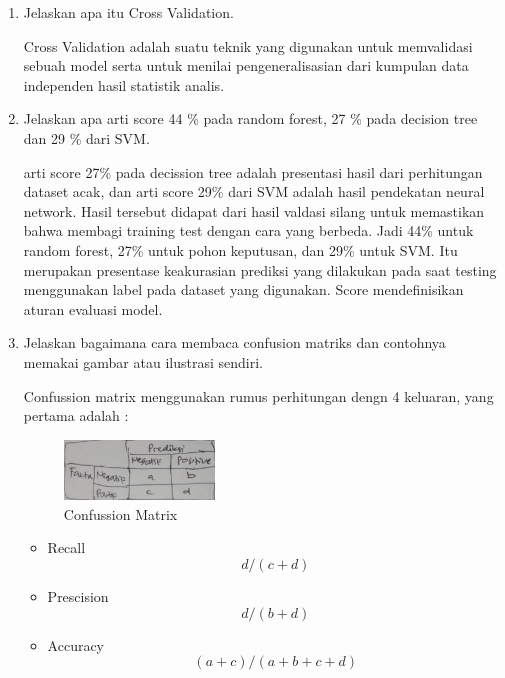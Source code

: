 \begin{enumerate}
        \item Jelaskan apa itu Cross Validation. \par
        Cross Validation adalah suatu teknik yang digunakan untuk memvalidasi sebuah model serta untuk menilai pengeneralisasian dari kumpulan data independen hasil statistik analis. 
        \item Jelaskan apa arti score 44 \% pada random forest, 27 \% pada decision tree dan 29 \% dari SVM. \par
        arti score 27\% pada decission tree adalah presentasi hasil dari perhitungan dataset acak, dan arti score 29\% dari SVM adalah hasil pendekatan neural network.  Hasil tersebut didapat dari hasil valdasi silang untuk memastikan bahwa membagi training test dengan cara yang berbeda. Jadi 44\% untuk random forest, 27\% untuk pohon keputusan, dan 29\% untuk SVM. Itu merupakan presentase keakurasian prediksi yang dilakukan pada saat testing menggunakan label pada dataset yang digunakan. Score mendefinisikan aturan evaluasi model.
        \item Jelaskan bagaimana cara membaca confusion matriks dan contohnya memakai gambar atau ilustrasi sendiri. \par
        Confussion matrix menggunakan rumus perhitungan dengn 4 keluaran, yang pertama adalah :
        \begin{figure}[H]
            \includegraphics[width=4cm]{figures/1174039/chapter3/confusion.jpeg}
            \centering
            \caption{Confussion Matrix}
        \end{figure}
            \begin{itemize}
                \item Recall
                \begin{equation}
                    d/(c+d)
                \end{equation}
                \item Prescision
                \begin{equation}
                    d/(b+d)
                \end{equation}
                \item Accuracy
                \begin{equation}
                    (a+c)/(a+b+c+d)
                \end{equation}

\end{itemize}
\end{enumerate}
